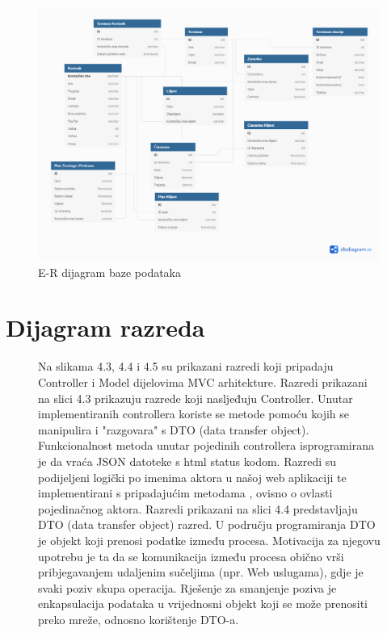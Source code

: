 				\begin{figure}[H]
					\hspace*{-1.5cm}
					\includegraphics[scale=0.4]{dijagrami/dijagram_baze_podataka.PNG} %
					\centering
					\caption{E-R dijagram baze podataka}
					\label{fig:promjene}
				\end{figure}
			
			\eject
			
			
		\section{Dijagram razreda}
		\begin{figure}[!htb]
		    Na slikama 4.3, 4.4 i 4.5 su prikazani razredi koji pripadaju Controller i Model dijelovima MVC
            arhitekture. Razredi prikazani na slici 4.3 prikazuju razrede koji nasljeđuju Controller. Unutar implementiranih controllera koriste se metode pomoću kojih se manipulira i "razgovara" s DTO (data transfer object). Funkcionalnost metoda unutar pojedinih controllera isprogramirana je da vraća JSON datoteke s html status kodom. Razredi su podijeljeni logički po imenima aktora u našoj web aplikaciji te implementirani s pripadajućim metodama , ovisno o ovlasti pojedinačnog aktora.
            Razredi prikazani na slici 4.4 predstavljaju DTO (data transfer object) razred. U području programiranja DTO je objekt koji prenosi podatke između procesa. Motivacija za njegovu upotrebu je ta da se komunikacija između procesa obično vrši pribjegavanjem udaljenim sučeljima (npr. Web uslugama), gdje je svaki poziv skupa operacija. Rješenje za smanjenje poziva je enkapsulacija  podataka u vrijednosni objekt koji se može prenositi preko mreže, odnosno korištenje DTO-a.
		\end{figure}
		
